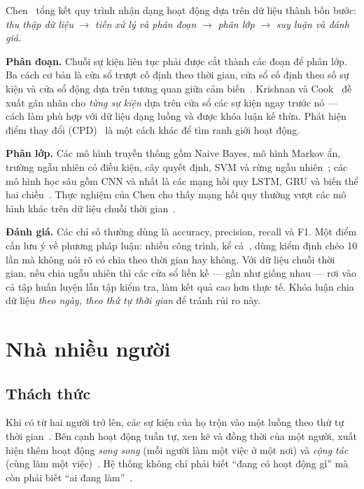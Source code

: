 Chen~\cite{chen2021thesis} tổng kết quy trình nhận dạng hoạt động dựa trên dữ liệu thành bốn bước:
\emph{thu thập dữ liệu} $\rightarrow$ \emph{tiền xử lý và phân đoạn} $\rightarrow$ \emph{phân lớp}
$\rightarrow$ \emph{suy luận và đánh giá}.

\textbf{Phân đoạn.} Chuỗi sự kiện liên tục phải được cắt thành các đoạn để phân lớp. Ba cách cơ
bản là cửa sổ trượt cố định theo thời gian, cửa sổ cố định theo số sự kiện và cửa sổ động dựa trên
tương quan giữa cảm biến~\cite{chen2021thesis,krishnan2014streaming}. Krishnan và
Cook~\cite{krishnan2014streaming} đề xuất gán nhãn cho \emph{từng sự kiện} dựa trên cửa sổ các sự
kiện ngay trước nó --- cách làm phù hợp với dữ liệu dạng luồng và được khóa luận kế thừa.
Phát hiện điểm thay đổi (CPD)~\cite{aminikhanghahi2017cpd} là một cách khác để tìm ranh giới hoạt
động.

\textbf{Phân lớp.} Các mô hình truyền thống gồm Naive Bayes, mô hình Markov ẩn, trường ngẫu nhiên
có điều kiện, cây quyết định, SVM và rừng ngẫu nhiên~\cite{breiman2001rf}; các mô hình học sâu gồm
CNN và nhất là các mạng hồi quy LSTM, GRU và biến thể hai chiều~\cite{cho2014gru,schuster1997brnn}.
Thực nghiệm của Chen cho thấy mạng hồi quy thường vượt các mô hình khác trên dữ liệu chuỗi thời
gian~\cite{chen2021thesis}.

\textbf{Đánh giá.} Các chỉ số thường dùng là accuracy, precision, recall và F1. Một điểm cần lưu ý
về phương pháp luận: nhiều công trình, kể cả~\cite{chen2021thesis}, dùng kiểm định chéo 10 lần mà
không nói rõ có chia theo thời gian hay không. Với dữ liệu chuỗi thời gian, nếu chia ngẫu nhiên thì
các cửa sổ liền kề --- gần như giống nhau --- rơi vào cả tập huấn luyện lẫn tập kiểm tra, làm kết
quả cao hơn thực tế. Khóa luận chia dữ liệu \emph{theo ngày, theo thứ tự thời gian} để tránh rủi ro
này.

\section{Nhà nhiều người}
\label{sec:bg-multi}

\subsection{Thách thức}

Khi có từ hai người trở lên, các sự kiện của họ trộn vào một luồng theo thứ tự thời
gian~\cite{benmansour2015survey}. Bên cạnh hoạt động tuần tự, xen kẽ và đồng thời của một người,
xuất hiện thêm hoạt động \emph{song song} (mỗi người làm một việc ở một nơi) và \emph{cộng tác}
(cùng làm một việc)~\cite{chen2021thesis}. Hệ thống không chỉ phải biết ``đang có hoạt động gì'' mà
còn phải biết ``ai đang làm''~\cite{singla2010multiresident}.

